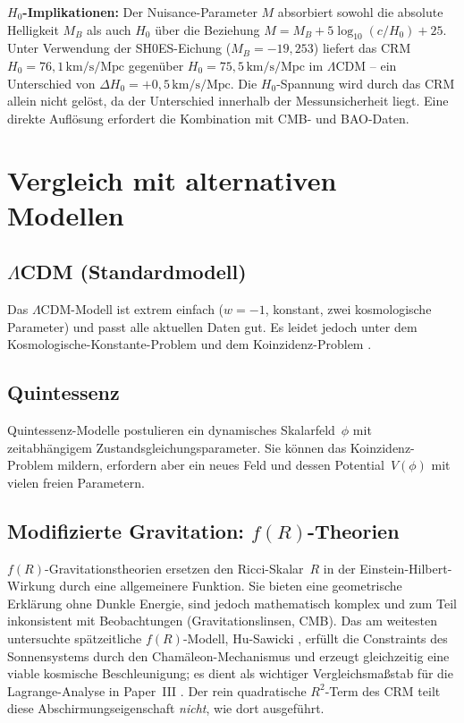 \documentclass[aps,prd,twocolumn,superscriptaddress,nofootinbib]{revtex4-2}
\begin{document}
\textbf{$H_0$-Implikationen:} Der Nuisance-Parameter $M$ absorbiert sowohl die absolute Helligkeit $M_B$ als auch $H_0$ über die Beziehung $M = M_B + 5\log_{10}(c/H_0) + 25$. Unter Verwendung der SH0ES-Eichung ($M_B = -19{,}253$) liefert das CRM $H_0 = 76{,}1\,\mathrm{km/s/Mpc}$ gegenüber $H_0 = 75{,}5\,\mathrm{km/s/Mpc}$ im $\Lambda$CDM -- ein Unterschied von $\Delta H_0 = +0{,}5\,\mathrm{km/s/Mpc}$. Die $H_0$-Spannung wird durch das CRM allein nicht gelöst, da der Unterschied innerhalb der Messunsicherheit liegt. Eine direkte Auflösung erfordert die Kombination mit CMB- und BAO-Daten.

\section{Vergleich mit alternativen Modellen}
\label{sec:alternatives}

\subsection{$\Lambda$CDM (Standardmodell)}

Das $\Lambda$CDM-Modell ist extrem einfach ($w = -1$, konstant, zwei kosmologische Parameter) und passt alle aktuellen Daten gut. Es leidet jedoch unter dem Kosmologische-Konstante-Problem und dem Koinzidenz-Problem \cite{Weinberg1989}.

\subsection{Quintessenz}

Quintessenz-Modelle \cite{Caldwell1998} postulieren ein dynamisches Skalarfeld~$\phi$ mit zeitabhängigem Zustandsgleichungsparameter. Sie können das Koinzidenz-Problem mildern, erfordern aber ein neues Feld und dessen Potential~$V(\phi)$ mit vielen freien Parametern.

\subsection{Modifizierte Gravitation: $f(R)$-Theorien}

$f(R)$-Gravitationstheorien \cite{Starobinsky1980, Sotiriou2010} ersetzen den Ricci-Skalar~$R$ in der Einstein-Hilbert-Wirkung durch eine allgemeinere Funktion. Sie bieten eine geometrische Erklärung ohne Dunkle Energie, sind jedoch mathematisch komplex und zum Teil inkonsistent mit Beobachtungen (Gravitationslinsen, CMB). Das am weitesten untersuchte spätzeitliche $f(R)$-Modell, Hu-Sawicki \cite{HuSawicki2007}, erfüllt die Constraints des Sonnensystems durch den Chamäleon-Mechanismus und erzeugt gleichzeitig eine viable kosmische Beschleunigung; es dient als wichtiger Vergleichsmaßstab für die Lagrange-Analyse in Paper~III \cite{Geiger2026c}. Der rein quadratische $R^2$-Term des CRM teilt diese Abschirmungseigenschaft \textit{nicht}, wie dort ausgeführt.
\end{document}
